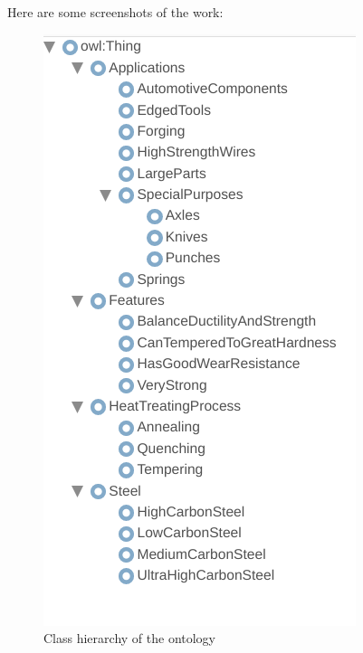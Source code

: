 \documentclass[12pt]{article}
\begin{document}
{Here are some screenshots of the work:
\begin{figure}[ht]
	\centering
	\includegraphics[scale=0.3]{figs/ex8-class-hierarchy.png}
	\caption{Class hierarchy of the ontology}
	\label{fig:label9}
\end{figure}
\begin{figure}[ht]
	\centering
\end{figure}}
\end{document}

